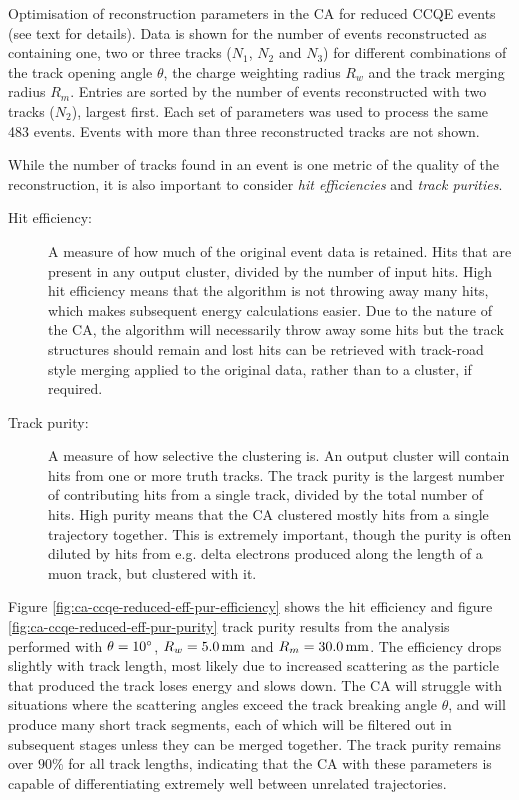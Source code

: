 \begin{table}
\caption[Optimisation of Cellular Automaton reconstruction parameters]{\label{table:ccqe-2tr-opt-results}Optimisation of reconstruction parameters in the \ac{CA} for reduced CCQE events (see text for details). Data is shown for the number of events reconstructed as containing one, two or three tracks ($N_1$, $N_2$ and $N_3$) for different combinations of the track opening angle $\theta$, the charge weighting radius $R_w$ and the track merging radius $R_m$. Entries are sorted by the number of events reconstructed with two tracks ($N_2$), largest first. Each set of parameters was used to process the same 483 events. Events with more than three reconstructed tracks are not shown.}
\end{table}

While the number of tracks found in an event is one metric of the quality of the reconstruction, it is also important to consider \emph{hit efficiencies} and \emph{track purities}.
\begin{description}
    \item[Hit efficiency:] A measure of how much of the original event data is retained. Hits that are present in any output cluster, divided by the number of input hits. High hit efficiency means that the algorithm is not throwing away many hits, which makes subsequent energy calculations easier. Due to the nature of the \ac{CA}, the algorithm will necessarily throw away some hits but the track structures should remain and lost hits can be retrieved with track-road style merging applied to the original data, rather than to a cluster, if required.
    \item[Track purity:] A measure of how selective the clustering is. An output cluster will contain hits from one or more truth tracks. The track purity is the largest number of contributing hits from a single track, divided by the total number of hits. High purity means that the \ac{CA} clustered mostly hits from a single trajectory together. This is extremely important, though the purity is often diluted by hits from e.g. delta electrons produced along the length of a muon track, but clustered with it.
\end{description}

Figure \ref{fig:ca-ccqe-reduced-eff-pur-efficiency} shows the hit efficiency and figure \ref{fig:ca-ccqe-reduced-eff-pur-purity} track purity results from the analysis performed with $\theta=10^\circ$, $R_w=5.0\,\mathrm{mm}$ and $R_m=30.0\,\mathrm{mm}$. The efficiency drops slightly with track length, most likely due to increased scattering as the particle that produced the track loses energy and slows down. The \ac{CA} will struggle with situations where the scattering angles exceed the track breaking angle $\theta$, and will produce many short track segments, each of which will be filtered out in subsequent stages unless they can be merged together. The track purity remains over $90\%$ for all track lengths, indicating that the \ac{CA} with these parameters is capable of differentiating extremely well between unrelated trajectories.


